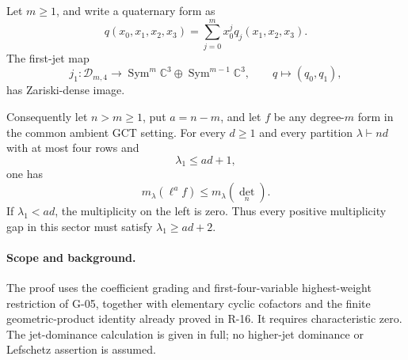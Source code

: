 \begin{proposition}\label{G-14}
Let $m\geq1$, and write a quaternary form as
\[
 q(x_0,x_1,x_2,x_3)=\sum_{j=0}^m x_0^j q_j(x_1,x_2,x_3).
\]
The first-jet map
\[
 j_1:\mathcal D_{m,4}\longrightarrow
   \operatorname{Sym}^m\mathbb C^3\oplus
   \operatorname{Sym}^{m-1}\mathbb C^3,
 \qquad q\longmapsto(q_0,q_1),
\]
has Zariski-dense image.

Consequently let $n>m\geq1$, put $a=n-m$, and let $f$ be
any degree-$m$ form in the common ambient GCT setting.
For every $d\geq1$ and every partition $\lambda\vdash nd$
with at most four rows and
\begin{equation}\label{G14:boundary}
 \lambda_1\leq ad+1,
\end{equation}
one has
\[
 m_\lambda(\ell^a f)\leq m_\lambda(\det_n).
\]
If $\lambda_1<ad$, the multiplicity on the left is zero.
Thus every positive multiplicity gap in this sector must
satisfy $\lambda_1\geq ad+2$.
\end{proposition}

\paragraph{Scope and background.}
The proof uses the coefficient grading and first-four-variable
highest-weight restriction of G-05, together with elementary
cyclic cofactors and the finite geometric-product identity
already proved in R-16. It requires characteristic zero.
The jet-dominance calculation is given in full; no higher-jet
dominance or Lefschetz assertion is assumed.

